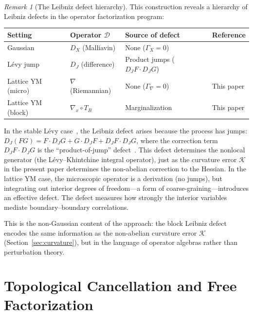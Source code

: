\documentclass[11pt,a4paper]{article}
\theoremstyle{plain}
\theoremstyle{definition}
\theoremstyle{remark}
\newtheorem{remark}[theorem]{Remark}
\newcommand{\cK}{\mathcal{K}}
\begin{document}
\begin{remark}[The Leibniz defect hierarchy]\label{rem:hierarchy}
This construction reveals a hierarchy of Leibniz defects in the
operator factorization program:

\begin{center}
\begin{tabular}{llll}
\toprule
Setting & Operator $\mathcal{D}$ & Source of defect & Reference \\
\midrule
Gaussian & $D_X$ (Malliavin) & None ($\Gamma_X = 0$) & \cite{Fontes2026a} \\
L\'evy jump & $D_J$ (difference) & Product jumps ($D_J F \cdot D_J G$) & \cite{Fontes2026i,Fontes2026d} \\
Lattice YM (micro) & $\nabla$ (Riemannian) & None ($\Gamma_\nabla = 0$) & This paper \\
Lattice YM (block) & $\nabla_x \circ T_B$ & Marginalization & This paper \\
\bottomrule
\end{tabular}
\end{center}

In the stable L\'evy case~\cite{Fontes2026d}, the Leibniz defect arises because the
process has jumps: $D_J(FG) = F \cdot D_J G + G \cdot D_J F + D_J F \cdot D_J G$,
where the correction term $D_J F \cdot D_J G$ is the ``product-of-jump''
defect~\cite{Fontes2026i}. This defect determines the nonlocal generator
(the L\'evy--Khintchine integral operator), just as the curvature error
$\cK$ in the present paper determines the non-abelian correction to the
Hessian. In the lattice YM case, the
microscopic operator is a derivation (no jumps), but integrating out
interior degrees of freedom---a form of coarse-graining---introduces
an effective defect. The defect measures how strongly the interior
variables mediate boundary--boundary correlations.

This is the non-Gaussian content of the approach: the block Leibniz
defect encodes the same information as the non-abelian
curvature error $\cK$ (Section~\ref{sec:curvature}), but in the
language of operator algebras rather than perturbation theory.
\end{remark}


\section{Topological Cancellation and Free Factorization}\label{sec:cancel}
\end{document}
